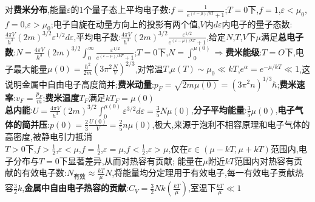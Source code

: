 \documentclass[10pt,a4paper]{article}
\begin{document}
\begin{multicols}{2}
对\textbf{费米分布},能量$\varepsilon$的$1$个量子态上平均电子数:$f=\frac{1}{e^{(\varepsilon-\mu)/kT}+1}$;$T=0$下,$f=1$,$\varepsilon<\mu_0$,$f=0$,$\varepsilon>\mu_0$;电子自旋在动量方向上的投影有两个值,$V$内$d\varepsilon$内电子的量子态数:$\frac{4\pi V}{h^3}(2m)^{3/2}\varepsilon^{1/2}d\varepsilon$,平均电子数:$\frac{4\pi V}{h^3}(2m)^{3/2}\frac{\varepsilon^{1/2}}{e^{(\varepsilon-\mu)/kT}+1}$,给定$N$,$T$,$V$下$\mu$满足\textbf{总电子数}:$N=\frac{4\pi V}{\hbar^3}(2m)^{3/2}\int_0^{\infty}\frac{\varepsilon^{1/2}}{e^{(\varepsilon-\mu)/kT}+1}$;$T=0$下,$N=\int_0^{\mu(0)}\Rightarrow$\textbf{费米能级}:$T=O$下,电子最大能量$\mu(0)=\frac{\hbar^2}{2m}\left(3\pi^2\frac{N}{V}\right)^{2/3}$,对常温$T$,$\mu(T)\sim\mu_0\ll kT$,$e^{\alpha}=e^{-\mu/kT}\ll1$,这说明金属中自由电子高度简并;\textbf{费米动量}:$p_F=\sqrt{2m\mu(0)}=(3\pi^2n)^{1/3}\hbar$;\textbf{费米速率}:$v_F=\frac{p_F}{m}$;\textbf{费米温度$T_F$}满足$kT_F=\mu(0)$\\
\textbf{总内能}:$U=\frac{4\pi V}{h^3}(2m)^{3/2}\int_0^{\mu(0)}\varepsilon^{3/2}d\varepsilon=\frac{3}{5}N\mu(0)$,\textbf{分子平均能量}:$\frac{3}{5}\mu(0)$,\textbf{电子气体的简并压}:$p(0)=\frac{2}{3}\frac{U(0)}{V}=\frac{2}{5}n\mu(0)$,极大,来源于泡利不相容原理和电子气体的高密度,被静电引力抵消\\
$T>0$下,$f>\frac{1}{2}$,$\varepsilon<\mu$,$f=\frac{1}{2}$,$\varepsilon=\mu$,$f<\frac{1}{2}$,$\varepsilon>\mu$,仅在$\varepsilon\in(\mu-kT,\mu+kT)$范围内,电子分布与$T=0$下显著差异,从而对热容有贡献;
能量在$\mu$附近$kT$范围内对热容有贡献的有效电子数:$N_{\text{有效}}\approx\frac{kT}{\mu}N$,将能量均分定理用于有效电子,每一有效电子贡献热容$\frac{3}{2}k$,\textbf{金属中自由电子热容的贡献}:$C_V=\frac{3}{2}Nk\left(\frac{kT}{\mu}\right)$,室温下$\frac{kT}{\mu}\ll1$\\

\end{multicols}
\end{document}
